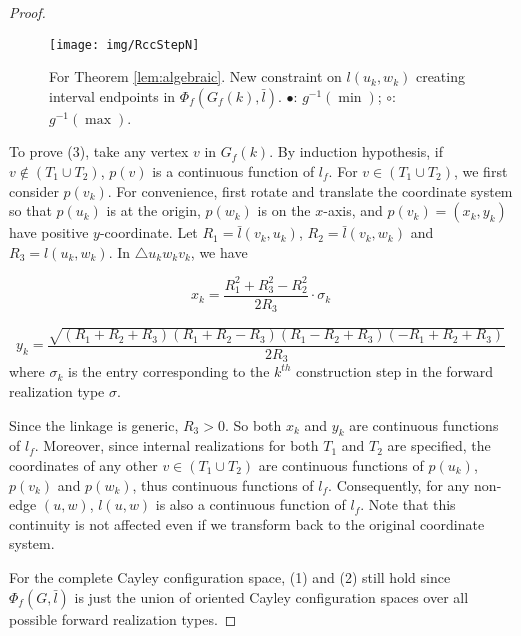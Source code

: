 \documentclass[secthm,amsthm,english]{article}
\theoremstyle{definition}
\theoremstyle{remark}
\begin{document}
\begin{proof}
\begin{figure}[h]
	 
	
	\begin{centering}
	\texttt{[image: img/RccStepN]} 
	\par\end{centering}
	
	\caption{For Theorem \ref{lem:algebraic}. New constraint on $l(u_{k},w_{k})$
	creating interval endpoints in $\Phi_{f}(G_{f}(k),\bar{l}).$ $\bullet$:
	$g^{-1}(\min)$; { } $\circ$: $g^{-1}(\max)$. }

\label{F:RccStepN} 
\end{figure}

To prove (3), take any vertex $v$ in $G_{f}(k)$. 
By induction hypothesis, if $v\notin (T_{1}\cup T_{2})$, $p(v)$ is a continuous function of $l_f$. 
For $v\in (T_{1}\cup T_{2})$,  we first consider $p(v_{k})$. 
For convenience, first rotate and translate the coordinate system
so that $p(u_{k})$ is at the origin,  $p(w_{k})$ is on the $x$-axis, 
and $p(v_{k}) = (x_k, y_k)$ have positive $y$-coordinate. Let $R_{1}=\bar{l}(v_{k},u_{k})$,
$R_{2}=\bar{l}(v_{k},w_{k})$ and $R_{3}=l(u_{k},w_{k})$.
In $\triangle u_kw_kv_k$, we have

\[x_{k}=\frac{R_{1}^{2}+R_{3}^{2}-R_{2}^{2}}{2R_{3}} \cdot \sigma_k\]

\[y_{k}=\frac{\sqrt{(R_{1}+R_{2}+R_{3})(R_{1}+R_{2}-R_{3})(R_{1}-R_{2}+R_{3})(-R_{1}+R_{2}+R_{3})}}{2R_{3}}\]
where $\sigma_k$ is the entry corresponding to the $k^{th}$ construction step in the forward realization type $\sigma$.  

Since the linkage is generic, $R_{3}>0$. So both $x_{k}$ and $y_{k}$ are continuous functions of $l_f$. 
Moreover, since internal realizations for both $T_{1}$ and $T_{2}$
are specified, the coordinates of any other $v\in (T_{1}\cup T_{2})$ 
are continuous functions of $p(u_{k})$, $p(v_{k})$ and $p(w_{k})$, 
thus continuous functions of $l_f$. 
Consequently, for any non-edge $(u,w)$, 
$l(u,w)$ is also a continuous function of $l_f$.
Note that this continuity is not affected even if we transform back to the original coordinate system. 

For the complete Cayley configuration space, (1) and (2) still hold 
since $\Phi_f(G,\bar{l})$ is just the union of  oriented Cayley configuration spaces 
over all possible forward realization types.
\end{proof}
\end{document}

